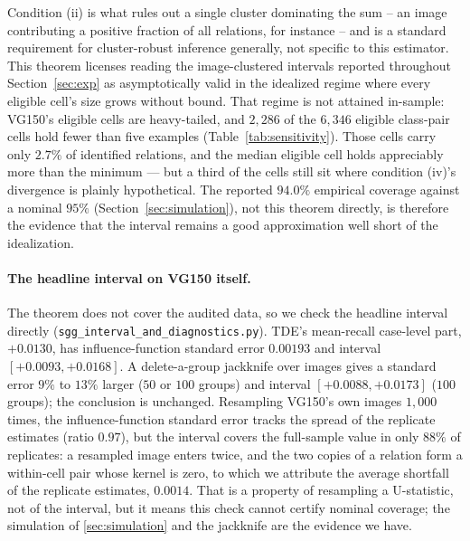 \begin{table}[t]
\centering
\footnotesize
\caption{\textbf{Coverage of the nominal 95\% case-level interval} by cell size, 400
replicates of about 4{,}000 relations each (\texttt{sim\_small\_cells.py}). SE/SD: mean
estimated standard error over the standard deviation of the estimates.}
\label{tab:smallcells}

\end{table}

Condition (ii) is what rules out a single cluster dominating the
sum -- an image contributing a positive fraction of all relations, for instance -- and
is a standard requirement for cluster-robust inference generally, not specific to this
estimator. This theorem licenses reading the image-clustered intervals reported
throughout Section~\ref{sec:exp} as asymptotically valid in the idealized regime where
every eligible cell's size grows without bound. That regime is not attained in-sample:
VG150's eligible cells are heavy-tailed, and $2{,}286$ of the $6{,}346$ eligible
class-pair cells hold fewer than five examples (Table~\ref{tab:sensitivity}). Those
cells carry only $2.7\%$ of identified relations, and the median eligible cell holds appreciably more than
the minimum --- but a third of the cells still sit where condition (iv)'s divergence is
plainly hypothetical. The reported $94.0\%$ empirical coverage against a nominal $95\%$
(Section~\ref{sec:simulation}), not this theorem directly, is therefore the evidence that
the interval remains a good approximation well short of the idealization.

\paragraph{The headline interval on VG150 itself.} The theorem does not cover the audited data,
so we check the headline interval directly (\texttt{sgg\_interval\_and\_diagnostics.py}). TDE's
mean-recall case-level part, $+0.0130$, has influence-function standard error $0.00193$ and
interval $[+0.0093,+0.0168]$. A delete-a-group jackknife over images gives a standard error
$9\%$ to $13\%$ larger ($50$ or $100$ groups) and interval $[+0.0088,+0.0173]$ ($100$ groups); the
conclusion is unchanged. Resampling VG150's own images $1{,}000$ times, the influence-function
standard error tracks the spread of the replicate estimates (ratio $0.97$), but the interval
covers the full-sample value in only $88\%$ of replicates: a resampled image enters twice, and the
two copies of a relation form a within-cell pair whose kernel is zero, to which we attribute the
average shortfall of the replicate estimates, $0.0014$. That is a property of resampling a U-statistic,
not of the interval, but it means this check cannot certify nominal coverage; the simulation of
\cref{sec:simulation} and the jackknife are the evidence we have.

